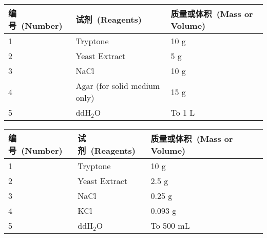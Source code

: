 \begin{table}[htbp]
\small
\centering
{
\par}
\begin{tabular*}{\textwidth}[c]{@{\extracolsep{\fill}}lll}
\toprule
编号\ (Number) & 试剂\ (Reagents) & 质量或体积\ (Mass or Volume)\\
\midrule
1 & Tryptone                     & 10 g\\
2 & Yeast Extract                & 5 g\\
3 & NaCl                         & 10 g\\
4 & Agar (for solid medium only) & 15 g\\
5 & ddH$_2$O                     & To 1 L\\
\bottomrule
\end{tabular*}
\end{table}

\begin{table}[htbp]
\small
\centering
{
\par}
\begin{tabular*}{\textwidth}[c]{@{\extracolsep{\fill}}lll}
\toprule
编号\ (Number) & 试剂\ (Reagents) & 质量或体积\ (Mass or Volume)\\
\midrule
1 & Tryptone                     & 10 g\\
2 & Yeast Extract                & 2.5 g\\
3 & NaCl                         & 0.25 g\\
4 & KCl                          & 0.093 g\\
5 & ddH$_2$O                     & To 500 mL\\
\bottomrule
\end{tabular*}
\end{table}

